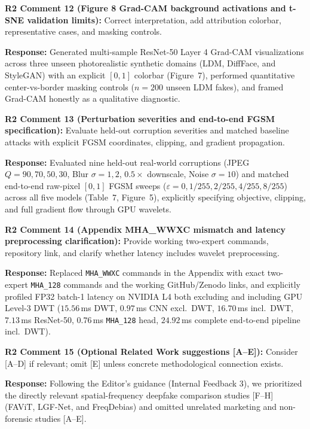 \documentclass[11pt,a4paper]{article}
\newcommand{\reviewercomment}[2]{%
  \vspace{0.6em}\noindent\begin{tcolorbox}[colback=boxbg,colframe=revcolor,boxrule=0.6pt,left=6pt,right=6pt,top=4pt,bottom=4pt]
  \textbf{\color{revcolor}#1:} #2
  \end{tcolorbox}
}
\newcommand{\authorresponse}[1]{%
  \noindent\textbf{\color{respcolor}Response:} #1\par\vspace{0.5em}
}
\begin{document}
\reviewercomment{R2 Comment 12 (Figure 8 Grad-CAM background activations and t-SNE validation limits)}{Correct interpretation, add attribution colorbar, representative cases, and masking controls.}
\authorresponse{Generated multi-sample ResNet-50 Layer 4 Grad-CAM visualizations across three unseen photorealistic synthetic domains (LDM, DiffFace, and StyleGAN) with an explicit $[0,1]$ colorbar (Figure~7), performed quantitative center-vs-border masking controls ($n=200$ unseen LDM fakes), and framed Grad-CAM honestly as a qualitative diagnostic.}

\reviewercomment{R2 Comment 13 (Perturbation severities and end-to-end FGSM specification)}{Evaluate held-out corruption severities and matched baseline attacks with explicit FGSM coordinates, clipping, and gradient propagation.}
\authorresponse{Evaluated nine held-out real-world corruptions (JPEG $Q=90,70,50,30$, Blur $\sigma=1,2$, $0.5\times$ downscale, Noise $\sigma=10$) and matched end-to-end raw-pixel $[0,1]$ FGSM sweeps ($\varepsilon=0,1/255,2/255,4/255,8/255$) across all five models (Table~7, Figure~5), explicitly specifying objective, clipping, and full gradient flow through GPU wavelets.}

\reviewercomment{R2 Comment 14 (Appendix MHA\_WWXC mismatch and latency preprocessing clarification)}{Provide working two-expert commands, repository link, and clarify whether latency includes wavelet preprocessing.}
\authorresponse{Replaced \texttt{MHA\_WWXC} commands in the Appendix with exact two-expert \texttt{MHA\_128} commands and the working GitHub/Zenodo links, and explicitly profiled FP32 batch-1 latency on NVIDIA L4 both excluding and including GPU Level-3 DWT ($15.56\,$ms DWT, $0.97\,$ms CNN excl.\ DWT, $16.70\,$ms incl.\ DWT, $7.13\,$ms ResNet-50, $0.76\,$ms \texttt{MHA\_128} head, $24.92\,$ms complete end-to-end pipeline incl.\ DWT).}

\reviewercomment{R2 Comment 15 (Optional Related Work suggestions [A--E])}{Consider [A--D] if relevant; omit [E] unless concrete methodological connection exists.}
\authorresponse{Following the Editor's guidance (Internal Feedback 3), we prioritized the directly relevant spatial-frequency deepfake comparison studies [F--H] (FAViT, LGF-Net, and FreqDebias) and omitted unrelated marketing and non-forensic studies [A--E].}
\end{document}
